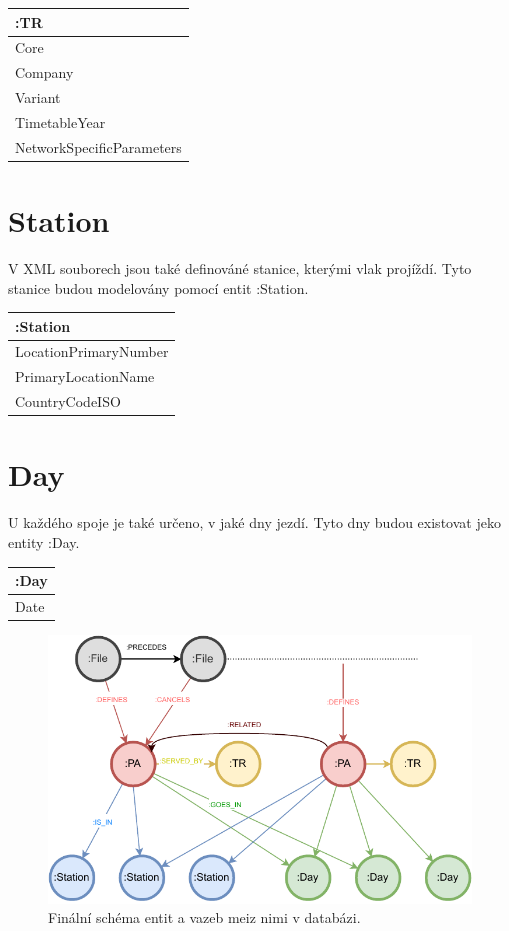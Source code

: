 \documentclass[10pt,xcolor=pdflatex,dvipsnames,table,oneside]{book}
\begin{document}
\vspace{1em}
\begin{tabular}{|l|}
    \hline
    :TR \\
    \hline
    Core \\
    Company \\
    Variant \\
    TimetableYear \\
    NetworkSpecificParameters \\
    \hline
\end{tabular}

\section{Station}
V XML souborech jsou také definováné stanice, kterými vlak projíždí. Tyto stanice budou modelovány pomocí
entit :Station.

\vspace{1em}
\begin{tabular}{|l|}
    \hline
    :Station \\
    \hline
    LocationPrimaryNumber \\
    PrimaryLocationName \\
    CountryCodeISO \\
    \hline
\end{tabular}

\vspace{2em}
\section{Day}
U každého spoje je také určeno, v jaké dny jezdí. Tyto dny budou existovat jeko entity :Day.

\vspace{1em}
\begin{tabular}{|l|}
    \hline
    :Day \\
    \hline
    Date \\
    \hline
\end{tabular}

\begin{figure}[h]
    \includegraphics[width=1\textwidth, angle=0]{img/structure.pdf}
    \caption{Finální schéma entit a vazeb meiz nimi v databázi.}
\end{figure}
\end{document}
